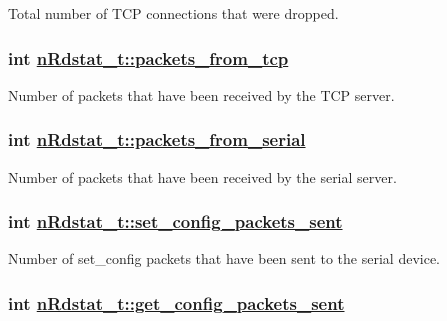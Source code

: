 Total number of TCP connections that were dropped. \hypertarget{structnRdstat__t_346e4fe879447dbe64689e46401d07d1}{
\subsubsection[packets\_\-from\_\-tcp]{\setlength{\rightskip}{0pt plus 5cm}int \hyperlink{structnRdstat__t_346e4fe879447dbe64689e46401d07d1}{n\-Rdstat\_\-t::packets\_\-from\_\-tcp}}}
\label{structnRdstat__t_346e4fe879447dbe64689e46401d07d1}


Number of packets that have been received by the TCP server. \hypertarget{structnRdstat__t_dfc822591f9e821e6835fc009158b187}{
\subsubsection[packets\_\-from\_\-serial]{\setlength{\rightskip}{0pt plus 5cm}int \hyperlink{structnRdstat__t_dfc822591f9e821e6835fc009158b187}{n\-Rdstat\_\-t::packets\_\-from\_\-serial}}}
\label{structnRdstat__t_dfc822591f9e821e6835fc009158b187}


Number of packets that have been received by the serial server. \hypertarget{structnRdstat__t_aee0b8cec83aff779e9b6a0062ba6677}{
\subsubsection[set\_\-config\_\-packets\_\-sent]{\setlength{\rightskip}{0pt plus 5cm}int \hyperlink{structnRdstat__t_aee0b8cec83aff779e9b6a0062ba6677}{n\-Rdstat\_\-t::set\_\-config\_\-packets\_\-sent}}}
\label{structnRdstat__t_aee0b8cec83aff779e9b6a0062ba6677}


Number of set\_\-config packets that have been sent to the serial device. \hypertarget{structnRdstat__t_fa233a9c22104e9ef722143968f18d32}{
\subsubsection[get\_\-config\_\-packets\_\-sent]{\setlength{\rightskip}{0pt plus 5cm}int \hyperlink{structnRdstat__t_fa233a9c22104e9ef722143968f18d32}{n\-Rdstat\_\-t::get\_\-config\_\-packets\_\-sent}}}
\label{structnRdstat__t_fa233a9c22104e9ef722143968f18d32}


